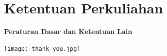 

\section{Ketentuan Perkuliahan}
\begin{frame}{\insertsectionhead}
	\framesubtitle{Peraturan Dasar dan Ketentuan Lain}
	\justifying


\end{frame}



{
	\texttt{[image: thank-you.jpg]}
}
\begin{frame}[plain]
\end{frame}